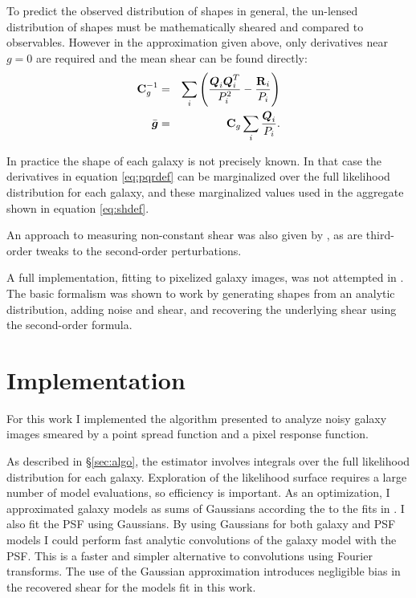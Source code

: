 \documentclass[12pt,preprint]{aastex}
\newcommand{\vecg}{\mbox{\boldmath $g$}}
\newcommand{\vecD}{\mbox{\boldmath $D$}}
\newcommand{\vecQ}{\mbox{\boldmath $Q$}}
\newcommand{\matR}{\mbox{$\bf R$}}
\newcommand{\matC}{\mbox{$\bf C$}}
\newcommand{\bnabg}{ \boldsymbol{\nabla_g}}
\begin{document}
To predict the observed distribution of shapes in
general, the un-lensed distribution of shapes must be mathematically sheared
and compared to observables.  However in the approximation given above, only
derivatives near $g=0$ are required and the mean shear can be found directly:
\begin{eqnarray} \label{eq:shdef}
\matC_g^{-1} & = & \sum_i \left(\frac{\vecQ_i \vecQ^T_i}{P_i^2} - \frac{\matR_i}{P_i}\right) \\
\bar{\vecg} & = &  \matC_g \sum_i \frac{\vecQ_i}{P_i}.
\end{eqnarray}

In practice the shape of each galaxy is not precisely known. In that case the
derivatives in equation \ref{eq:pqrdef} can be marginalized over the full
likelihood distribution for each galaxy, and these marginalized values used
in the aggregate shown in equation \ref{eq:shdef}.  

An approach to measuring non-constant shear was also given by \cite{ba14}, as
are third-order tweaks to the second-order perturbations.

A full implementation, fitting to pixelized galaxy images, was not attempted in
\citet{ba14}.  The basic formalism was shown to work by generating shapes from
an analytic distribution, adding noise and shear, and recovering the underlying
shear using the second-order formula.

\section{Implementation} \label{sec:impl}

For this work I implemented the algorithm presented \citet{ba14} to analyze
noisy galaxy images smeared by a point spread function and a pixel response
function.

As described in \S \ref{sec:algo}, the estimator involves integrals over the
full likelihood distribution for each galaxy.  Exploration of the likelihood
surface requires a large number of model evaluations, so efficiency is
important.  As an optimization, I approximated galaxy models as sums of
Gaussians according the to the fits in \citet{HoggGMix}.  I also fit the PSF
using Gaussians.  By using Gaussians for both galaxy and PSF models I could
perform fast analytic convolutions of the galaxy model with the PSF.  This is a
faster and simpler alternative to convolutions using Fourier transforms. The
use of the Gaussian approximation introduces negligible bias in the recovered
shear for the models fit in this work.
\end{document}
